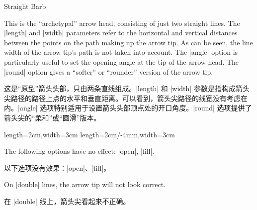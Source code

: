 \begin{arrowtip}{Straight Barb}{
    This is the ``archetypal'' arrow head, consisting of just two straight
    lines. The |length| and |width| parameters refer to the horizontal and
    vertical distances between the points on the path making up the arrow tip.
    As can be seen, the line width of the arrow tip's path is not taken into
    account. The |angle| option is particularly useful to set the opening angle
    at the tip of the arrow head. The |round| option gives a ``softer'' or
    ``rounder'' version of the arrow tip.

    这是“原型”箭头头部，只由两条直线组成。|length| 和 |width| 参数是指构成箭头尖路径的路径上点的水平和垂直距离。可以看到，箭头尖路径的线宽没有考虑在内。|angle| 选项特别适用于设置箭头头部顶点处的开口角度。|round| 选项提供了箭头尖的“柔和”或“圆滑”版本。

}%
{length=2cm,width=3cm}%
{length=2cm/-4mm,width=3cm}

    \begin{arrowexamples}
        \arrowexample[]
        \arrowexampledup[]
        \arrowexampledupdot[]
        \arrowexample[length=5pt]
        \arrowexample[length=5pt,width=5pt]
        \arrowexample[line width=2pt]
        \arrowexample[reversed]
        \arrowexample[angle=60:2pt 3]
        \arrowexample[round]
        \arrowexample[slant=.3]
        \arrowexample[left]
        \arrowexample[right]
        \arrowexample[red]
    \end{arrowexamples}
    The following options have no effect: |open|, |fill|.

    以下选项没有效果：|open|、|fill|。



    On |double| lines, the arrow tip will not look correct.

    在 |double| 线上，箭头尖看起来不正确。


\end{arrowtip}


